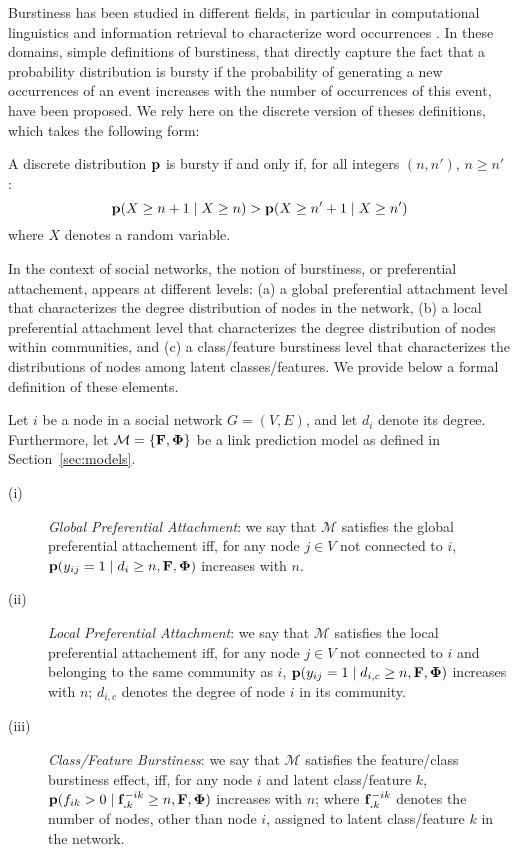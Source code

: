 Burstiness has been studied in different fields, in particular in computational linguistics and information retrieval to characterize word occurrences \cite{church1995poisson}. In these domains, simple definitions of burstiness, that directly capture the fact that a probability distribution is bursty if the probability of generating a new occurrences of an event increases with the number of occurrences of this event, have been proposed\cite{clinchant2008bnb,clinchant2010information}. We rely here on the discrete version of theses definitions, which takes the following form:
%
\begin{definition}[Burstiness]
	A discrete distribution $\mathbf{p}$ is bursty if and only if, for all integers $(n, n')$, $n \geq n'$ :
	\begin{equation}
	\mathbf{p}(X \geq n+1 \mid X \geq n) > \mathbf{p}(X \geq n'+1 \mid X \geq n') \nonumber
	\end{equation}
	where $X$ denotes a random variable.
\label{def:burst}
\end{definition}
%
In the context of social networks, the notion of burstiness, or preferential attachement, appears at different levels: (a) a global preferential attachment level that characterizes the degree distribution of nodes in the network, (b) a local preferential attachment level that characterizes the degree distribution of nodes within communities, and (c) a class/feature burstiness level that characterizes the distributions of nodes among latent classes/features. We provide below a formal definition of these elements.
%
\begin{definition}
Let $i$ be a node in a social network $G=(V,E)$, and let $d_i$ denote its degree. Furthermore, let $\mathcal{M}=\{\mathbf{F},\mathbf{\Phi}\}$ be a link prediction model as defined in Section~\ref{sec:models}.
\begin{description}
 \item[(i)] \emph{Global Preferential Attachment}: we say that $\mathcal{M}$ satisfies the global preferential attachement iff, for any node $j \in V$ not connected to $i$, $\mathbf{p}(y_{ij}=1 \mid d_i \ge n, \mathbf{F}, \mathbf{\Phi})$ increases with $n$.
 \item[(ii)] \emph{Local Preferential Attachment}: we say that $\mathcal{M}$ satisfies the local preferential attachement iff, for any node $j \in V$ not connected to $i$ and belonging to the same community as $i$, $\mathbf{p}(y_{ij}=1 \mid d_{i,c} \ge n, \mathbf{F}, \mathbf{\Phi})$ increases with $n$; $d_{i,c}$ denotes the degree of node $i$ in its community.
  \item[(iii)] \emph{Class/Feature Burstiness}: we say that $\mathcal{M}$ satisfies the feature/class burstiness effect, iff, for any node $i$ and latent class/feature $k$, $\mathbf{p}(f_{ik} > 0 \mid \mathbf{f}_{\bm{.}k}^{-ik} \ge n, \mathbf{F}, \mathbf{\Phi})$ increases with $n$; where $\mathbf{f}_{\bm{.}k}^{-ik}$ denotes the number of nodes, other than node $i$, assigned to latent class/feature $k$ in the network.
\end{description}
\label{def:burst-soc-net}
\end{definition}
